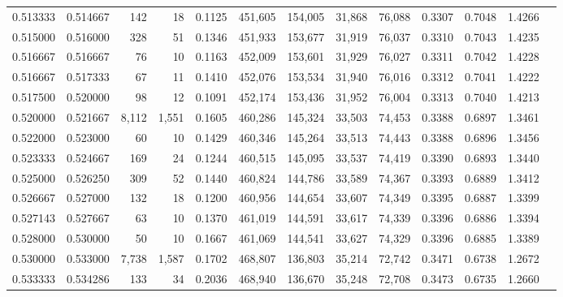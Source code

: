 \begin{tabular}{rrrrrrrrrrrrr}
0.513333 & 0.514667 &    142 &    18 &                                     0.1125 & 451,605 & 154,005 &  31,868 &  76,088 & 0.3307 & 0.7048 & 1.4266 \\
0.515000 & 0.516000 &    328 &    51 &                                     0.1346 & 451,933 & 153,677 &  31,919 &  76,037 & 0.3310 & 0.7043 & 1.4235 \\
0.516667 & 0.516667 &     76 &    10 &                                     0.1163 & 452,009 & 153,601 &  31,929 &  76,027 & 0.3311 & 0.7042 & 1.4228 \\
0.516667 & 0.517333 &     67 &    11 &                                     0.1410 & 452,076 & 153,534 &  31,940 &  76,016 & 0.3312 & 0.7041 & 1.4222 \\
0.517500 & 0.520000 &     98 &    12 &                                     0.1091 & 452,174 & 153,436 &  31,952 &  76,004 & 0.3313 & 0.7040 & 1.4213 \\
0.520000 & 0.521667 &  8,112 & 1,551 &                                     0.1605 & 460,286 & 145,324 &  33,503 &  74,453 & 0.3388 & 0.6897 & 1.3461 \\
0.522000 & 0.523000 &     60 &    10 &                                     0.1429 & 460,346 & 145,264 &  33,513 &  74,443 & 0.3388 & 0.6896 & 1.3456 \\
0.523333 & 0.524667 &    169 &    24 &                                     0.1244 & 460,515 & 145,095 &  33,537 &  74,419 & 0.3390 & 0.6893 & 1.3440 \\
0.525000 & 0.526250 &    309 &    52 &                                     0.1440 & 460,824 & 144,786 &  33,589 &  74,367 & 0.3393 & 0.6889 & 1.3412 \\
0.526667 & 0.527000 &    132 &    18 &                                     0.1200 & 460,956 & 144,654 &  33,607 &  74,349 & 0.3395 & 0.6887 & 1.3399 \\
0.527143 & 0.527667 &     63 &    10 &                                     0.1370 & 461,019 & 144,591 &  33,617 &  74,339 & 0.3396 & 0.6886 & 1.3394 \\
0.528000 & 0.530000 &     50 &    10 &                                     0.1667 & 461,069 & 144,541 &  33,627 &  74,329 & 0.3396 & 0.6885 & 1.3389 \\
0.530000 & 0.533000 &  7,738 & 1,587 &                                     0.1702 & 468,807 & 136,803 &  35,214 &  72,742 & 0.3471 & 0.6738 & 1.2672 \\
0.533333 & 0.534286 &    133 &    34 &                                     0.2036 & 468,940 & 136,670 &  35,248 &  72,708 & 0.3473 & 0.6735 & 1.2660 \\

\end{tabular}
